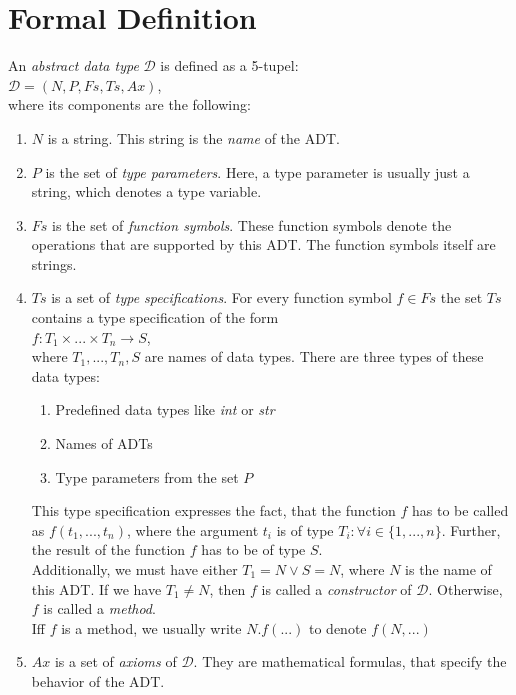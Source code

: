 \documentclass{article}
\begin{document}
	
\section*{Formal Definition}

An \emph{abstract data type} \(\mathcal{D}\) is defined as a 5-tupel: \\
\(\mathcal{D} = (N, P, Fs, Ts, Ax)\),\\
where its components are the following:

\begin{enumerate}
	\item \(N\) is a string. This string is the \emph{name} of the ADT.
	\item \(P\) is the set of \emph{type parameters}. Here, a type parameter is usually just a string, which denotes a type variable.
	\item \(Fs\) is the set of \emph{function symbols}. These function symbols denote the operations that are supported by this ADT. The function symbols itself are strings.
	\item \(Ts\) is a set of \emph{type specifications}. For every function symbol \(f \in Fs\) the set \(Ts\) contains a type specification of the form \\
	\(f: T_1 \times ... \times T_n \rightarrow S\), \\
	where \(T_1, ..., T_n, S\) are names of data types. There are three types of these data types:
		\begin{enumerate}
			\item Predefined data types like \emph{int} or \emph{str}
			\item Names of ADTs
			\item Type parameters from the set \(P\)
		\end{enumerate}
	This type specification expresses the fact, that the function \(f\) has to be called as \(f(t_1, ..., t_n)\), where the argument \(t_i\) is of type \(T_i : \forall i \in \{1, ..., n\}\). Further, the result of the function \(f\) has to be of type \(S\). \\
	Additionally, we must have either \(T_1 = N \lor S = N\), where \(N\) is the name of this ADT. If we have \(T_1 \ne N\), then \(f\) is called a \emph{constructor} of \(\mathcal{D}\). Otherwise, \(f\) is called a \emph{method}. \\
	Iff \(f\) is a method, we usually write \(N\).\(f(...)\) to denote \(f(N, ...)\)
	\item \(Ax\) is a set of \emph{axioms} of \(\mathcal{D}\). They are mathematical formulas, that specify the behavior of the ADT.
\end{enumerate}
	
\end{document}
